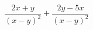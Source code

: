 \begin{ex}
	\begin{condition}
		\( \dfrac{2x+y}{(x-y)^2}+\dfrac{2y-5x}{(x-y)^2} \)
	\end{condition}
\end{ex}